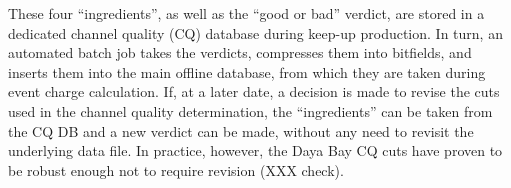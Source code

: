 \documentclass[../thesis.tex]{subfiles}
\begin{document}
These four ``ingredients'', as well as the ``good or bad'' verdict, are stored
in a dedicated channel quality (CQ) database during keep-up production. In turn,
an automated batch job takes the verdicts, compresses them into bitfields, and
inserts them into the main offline database, from which they are taken during
event charge calculation. If, at a later date, a decision is made to revise the
cuts used in the channel quality determination, the ``ingredients'' can be taken
from the CQ DB and a new verdict can be made, without any need to revisit the
underlying data file. In practice, however, the Daya Bay CQ cuts have proven to
be robust enough not to require revision (XXX check).

\subfilebackmatter
\end{document}
